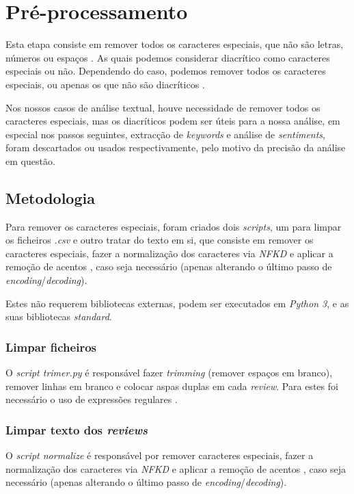 \chapter{Pré-processamento}
\label{cap4}

Esta etapa consiste em remover todos os caracteres especiais, que não são letras, números ou espaços \cite{u1}. As quais podemos considerar diacrítico como caracteres especiais ou não. Dependendo do caso, podemos remover todos os caracteres especiais, ou apenas os que não são diacríticos \cite{cr1}.

Nos nossos casos de análise textual, houve necessidade de remover todos os caracteres especiais, mas os diacríticos podem ser úteis para a nossa análise, em especial nos passos seguintes, extracção de \textit{keywords} e análise de \textit{sentiments}, foram descartados ou usados respectivamente, pelo motivo da precisão da análise em questão.

\section{Metodologia}

Para remover os caracteres especiais, foram criados dois \textit{scripts}, um para limpar os ficheiros \textit{.csv} e outro tratar do texto em si, que consiste em remover os caracteres especiais, fazer a normalização dos caracteres via \textit{NFKD} e aplicar a remoção de acentos \cite{cr1}, caso seja necessário (apenas alterando o último passo de \textit{encoding}/\textit{decoding}).

Estes não requerem bibliotecas externas, podem ser executados em \textit{Python 3}, e as suas bibliotecas \textit{standard}.

\subsection{Limpar ficheiros}

O \textit{script trimer.py} é responsável fazer \textit{trimming} (remover espaços em branco), remover linhas em branco e colocar aspas duplas em cada \textit{review}. Para estes foi necessário o uso de expressões regulares \cite{u1}.

\subsection{Limpar texto dos \textit{reviews}}

O \textit{script normalize} é responsável por remover caracteres especiais, fazer a normalização dos caracteres via \textit{NFKD} e aplicar a remoção de acentos \cite{cr1}, caso seja necessário (apenas alterando o último passo de \textit{encoding}/\textit{decoding}).

